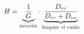 \documentclass[preview]{standalone}
\begin{document}
\begin{align*}
\special{dvisvgm:raw <g id='unique000'>}H = \underbrace{\frac{1}{G}}_{\text{invertir}}\cdot\underbrace{\frac{D_{rr}}{D_{rr}+D_{vv}}}_{\text{limpiar el ruido}}\special{dvisvgm:raw </g>}
\end{align*}
\end{document}
